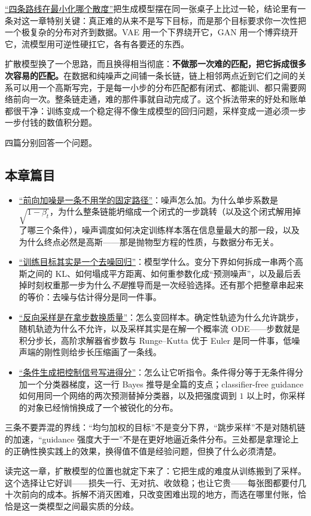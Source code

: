 \hyperref[sec:14-Deep-Learning/07-Generative-Models-Unified/01]{``四条路线在最小化哪个散度''}把生成模型摆在同一张桌子上比过一轮，结论里有一条对这一章特别关键：真正难的从来不是写下目标，而是那个目标要求你一次性把一个极复杂的分布对齐到数据。VAE 用一个下界绕开它，GAN 用一个博弈绕开它，流模型用可逆性硬扛它，各有各要还的东西。

扩散模型换了一个思路，而且换得相当彻底：\textbf{不做那一次难的匹配，把它拆成很多次容易的匹配。}在数据和纯噪声之间铺一条长链，链上相邻两点近到它们之间的关系可以用一个高斯写完，于是每一小步的分布匹配都有闭式、都能训、都只需要网络前向一次。整条链走通，难的那件事就自动完成了。这个拆法带来的好处和账单都很干净：训练变成一个稳定得不像生成模型的回归问题，采样变成一道必须一步一步付钱的数值积分题。

四篇分别回答一个问题。

\subsection{本章篇目}

\begin{itemize}
\tightlist
\item \hyperref[sec:14-Deep-Learning/08-Diffusion-Models/01]{``前向加噪是一条不用学的固定路径''}：噪声怎么加。为什么单步系数是 \(\sqrt{1-\beta_t}\)，为什么整条链能坍缩成一个闭式的一步跳转（以及这个闭式解用掉了哪三个条件），噪声调度如何决定训练样本落在信息量最大的那一段，以及为什么终点必然是高斯——那是抛物型方程的性质，与数据分布无关。
\item \hyperref[sec:14-Deep-Learning/08-Diffusion-Models/02]{``训练目标其实是一个去噪回归''}：模型学什么。变分下界如何拆成一串两个高斯之间的 KL、如何塌成平方距离、如何重参数化成``预测噪声''，以及最后丢掉时刻权重那一步为什么\emph{不是}推导而是一次经验选择。还有那个把整章串起来的等价：去噪与估计得分是同一件事。
\item \hyperref[sec:14-Deep-Learning/08-Diffusion-Models/03]{``反向采样是在拿步数换质量''}：怎么变回样本。确定性轨迹为什么允许跳步，随机轨迹为什么不允许，以及采样其实是在解一个概率流 ODE——步数就是积分步长，高阶求解器省步数与 Runge--Kutta 优于 Euler 是同一件事，低噪声端的刚性则给步长压缩画了一条线。
\item \hyperref[sec:14-Deep-Learning/08-Diffusion-Models/04]{``条件生成把控制信号写进得分''}：怎么让它听指令。条件得分等于无条件得分加一个分类器梯度，这一行 Bayes 推导是全篇的支点；classifier-free guidance 如何用同一个网络的两次预测替掉分类器，以及把强度调到 \(1\) 以上时，你采样的对象已经悄悄换成了一个被锐化的分布。
\end{itemize}

三条不要弄混的界线：``均匀加权的目标''不是变分下界，``跳步采样''不是对随机链的加速，``guidance 强度大于一''不是在更好地逼近条件分布。三处都是拿理论上的正确性换实践上的效果，换得值不值是经验问题，但换了什么必须清楚。

读完这一章，扩散模型的位置也就定下来了：它把生成的难度从训练搬到了采样。这个选择让它好训——损失一行、无对抗、收敛稳；也让它贵——每张图都要付几十次前向的成本。拆解不消灭困难，只改变困难出现的地方，而选在哪里付账，恰恰是这一类模型之间最实质的分歧。
